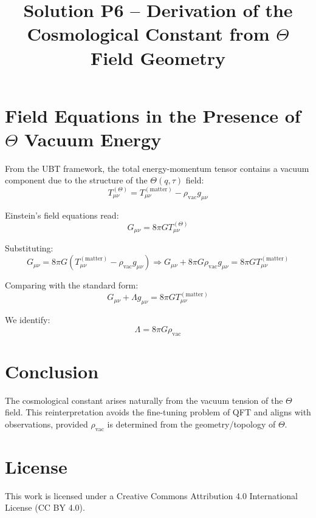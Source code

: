 \documentclass[12pt]{article}
\title{Solution P6 – Derivation of the Cosmological Constant from $\Theta$ Field Geometry}
\author{}
\date{}
\begin{document}
\maketitle


\SpeculativeContentWarning

\section*{Field Equations in the Presence of $\Theta$ Vacuum Energy}

From the UBT framework, the total energy-momentum tensor contains a vacuum component due to the structure of the $\Theta(q,\tau)$ field:
\[
T_{\mu\nu}^{(\Theta)} = T_{\mu\nu}^{(\text{matter})} - \rho_{\text{vac}} g_{\mu\nu}
\]

Einstein's field equations read:
\[
G_{\mu\nu} = 8\pi G T_{\mu\nu}^{(\Theta)}
\]

Substituting:
\[
G_{\mu\nu} = 8\pi G \left( T_{\mu\nu}^{(\text{matter})} - \rho_{\text{vac}} g_{\mu\nu} \right)
\Rightarrow G_{\mu\nu} + 8\pi G \rho_{\text{vac}} g_{\mu\nu} = 8\pi G T_{\mu\nu}^{(\text{matter})}
\]

Comparing with the standard form:
\[
G_{\mu\nu} + \Lambda g_{\mu\nu} = 8\pi G T_{\mu\nu}^{(\text{matter})}
\]

We identify:
\[
\Lambda = 8\pi G \rho_{\text{vac}}
\]

\section*{Conclusion}

The cosmological constant arises naturally from the vacuum tension of the $\Theta$ field. This reinterpretation avoids the fine-tuning problem of QFT and aligns with observations, provided $\rho_{\text{vac}}$ is determined from the geometry/topology of $\Theta$.


\section*{License}
This work is licensed under a Creative Commons Attribution 4.0 International License (CC BY 4.0).
\end{document}

